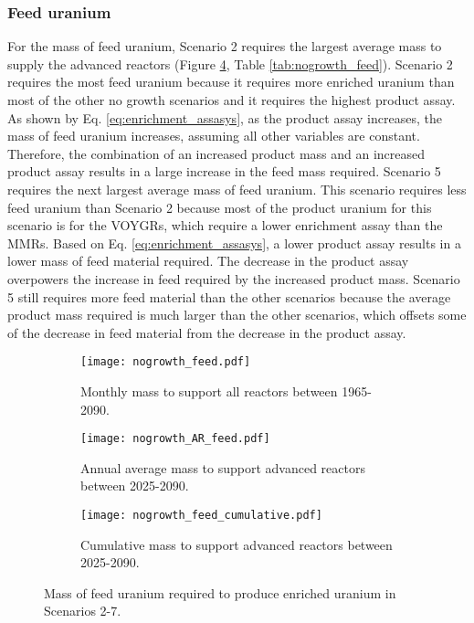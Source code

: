 \subsubsection{Feed uranium}
For the mass of feed uranium, Scenario 2 requires the largest average mass 
to supply the advanced reactors (Figure \ref{fig:nogrowth_feed}, Table 
\ref{tab:nogrowth_feed}). Scenario 2 requires the most feed uranium 
because it requires more enriched uranium than most 
of the other no growth scenarios and it requires the highest product 
assay. As shown by Eq. \ref{eq:enrichment_assasys}, as the product assay 
increases, the mass of feed uranium increases, assuming all other 
variables are constant. Therefore, the combination of an increased product 
mass and an increased product assay results in a large increase in the feed 
mass required. Scenario 5 requires the next largest average 
mass of feed uranium. This scenario requires less feed uranium than Scenario 2 
because 
most of the product uranium for this scenario is for the VOYGRs, which 
require a lower enrichment assay than the \glspl{MMR}. Based on Eq. 
\ref{eq:enrichment_assasys}, a lower product assay results in 
a lower mass of feed material required. The decrease in the product 
assay overpowers the increase in feed required by the increased product mass. 
Scenario 5 still requires more feed 
material than the other scenarios because the average product mass required 
is much larger than the other scenarios, which offsets some of the decrease 
in feed material from the decrease in the product assay. 

\begin{figure}[h!]
    \centering
    \begin{subfigure}[b]{0.45\textwidth}
        \centering
        \texttt{[image: nogrowth\_feed.pdf]}
        \caption{Monthly mass to support all reactors between 1965-2090.}
        \label{fig:nogrowth_all_feed}
    \end{subfigure}
    \hfill
    \begin{subfigure}[b]{0.45\textwidth}
        \centering
        \texttt{[image: nogrowth\_AR\_feed.pdf]}
        \caption{Annual average mass to support
        advanced reactors between 2025-2090.}
        \label{fig:nogrowth_AR_feed}
    \end{subfigure}
    \begin{subfigure}[b]{0.45\textwidth}
        \centering
        \texttt{[image: nogrowth\_feed\_cumulative.pdf]}
        \caption{Cumulative mass to support advanced reactors between 2025-2090.}
        \label{fig:nogrowth_feed_cumulative}
    \end{subfigure}
       \caption{Mass of feed uranium required to produce enriched uranium
        in Scenarios 2-7.}
       \label{fig:nogrowth_feed}
\end{figure}

